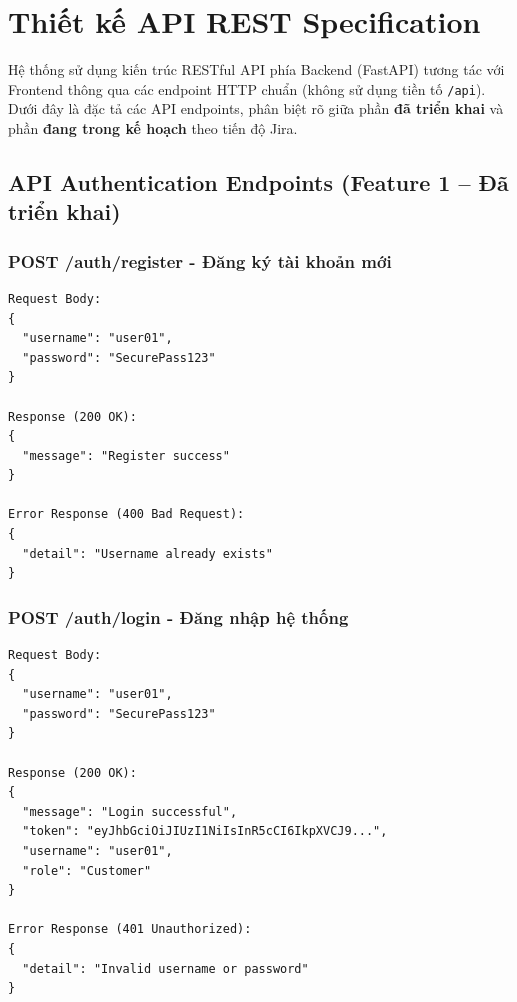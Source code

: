 \begin{figure}[htbp]
    \centering
    \label{fig:login_screen}
\end{figure}

\newpage
\section{Thiết kế API REST Specification}
Hệ thống sử dụng kiến trúc RESTful API phía Backend (FastAPI) tương tác với Frontend thông qua các endpoint HTTP chuẩn (không sử dụng tiền tố \texttt{/api}). Dưới đây là đặc tả các API endpoints, phân biệt rõ giữa phần \textbf{đã triển khai} và phần \textbf{đang trong kế hoạch} theo tiến độ Jira.

\subsection{API Authentication Endpoints (Feature 1 -- Đã triển khai)}

\subsubsection{POST /auth/register - Đăng ký tài khoản mới}
\begin{verbatim}
Request Body:
{
  "username": "user01",
  "password": "SecurePass123"
}

Response (200 OK):
{
  "message": "Register success"
}

Error Response (400 Bad Request):
{
  "detail": "Username already exists"
}
\end{verbatim}

\subsubsection{POST /auth/login - Đăng nhập hệ thống}
\begin{verbatim}
Request Body:
{
  "username": "user01",
  "password": "SecurePass123"
}

Response (200 OK):
{
  "message": "Login successful",
  "token": "eyJhbGciOiJIUzI1NiIsInR5cCI6IkpXVCJ9...",
  "username": "user01",
  "role": "Customer"
}

Error Response (401 Unauthorized):
{
  "detail": "Invalid username or password"
}
\end{verbatim}

